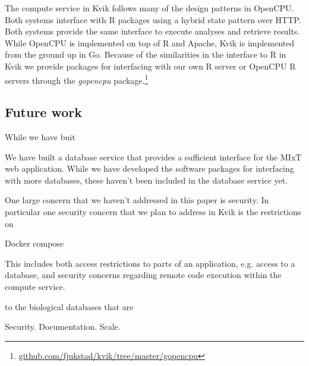 
The compute service in Kvik follows many of the design patterns in
OpenCPU. Both systems interface with R packages using a hybrid state pattern
over HTTP. Both systems provide the same interface to execute analyses and
retrieve results.  While OpenCPU is implemented on top of R and Apache, Kvik is
implemented from the ground up in Go. Because of the similarities in the
interface to R in Kvik we provide packages for interfacing with our own R server
or OpenCPU R servers through the
\emph{gopencpu} package.\footnote{\url{github.com/fjukstad/kvik/tree/master/gopencpu}} 


\subsection*{Future work} 
While we have buit 

We have built a database service that provides a sufficient interface for the
MIxT web application. While we have developed the software packages for
interfacing with more databases, these haven't been included in the database
service yet. 

One large concern that we haven't addressed in this paper is security. In
particular one security concern that we plan to address in Kvik is the
restrictions on 

Docker compose 

This
includes both access restrictions to parts of an application, e.g. access to a
database, and security concerns regarding remote code execution within the
compute service. 

to the 
biological databases that are 

Security.
Documentation.
Scale. 
